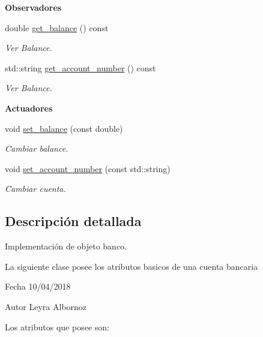 \begin{Indent}{\bf Observadores}\par
\begin{DoxyCompactItemize}
\item 
double \hyperlink{class_cbank__account_a3a04a3ddbbe032c369aa3cf483720f5c}{get\+\_\+balance} () const 
\begin{DoxyCompactList}\small\item\em Ver Balance. \end{DoxyCompactList}\item 
std\+::string \hyperlink{class_cbank__account_a666b0e292527ad2886f34a93789ab80d}{get\+\_\+account\+\_\+number} () const 
\begin{DoxyCompactList}\small\item\em Ver Balance. \end{DoxyCompactList}\end{DoxyCompactItemize}
\end{Indent}
\begin{Indent}{\bf Actuadores}\par
\begin{DoxyCompactItemize}
\item 
void \hyperlink{class_cbank__account_ab47bf4fce0d38963c39ce893553b951f}{set\+\_\+balance} (const double)
\begin{DoxyCompactList}\small\item\em Cambiar balance. \end{DoxyCompactList}\item 
void \hyperlink{class_cbank__account_a920a324760772b2018fe4a4812a8eeca}{set\+\_\+account\+\_\+number} (const std\+::string)
\begin{DoxyCompactList}\small\item\em Cambiar cuenta. \end{DoxyCompactList}\end{DoxyCompactItemize}
\end{Indent}


\subsection{Descripción detallada}
Implementación de objeto banco. 

La siguiente clase posee los atributos basicos de una cuenta bancaria \begin{DoxyDate}{Fecha}
10/04/2018 
\end{DoxyDate}
\begin{DoxyAuthor}{Autor}
Leyra Albornoz
\end{DoxyAuthor}
Los atributos que posee son\+:


